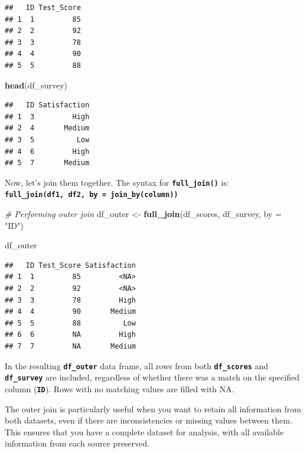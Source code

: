 \documentclass[
]{book}
\newenvironment{Shaded}{\begin{snugshade}}{\end{snugshade}}
\newcommand{\AttributeTok}[1]{\textcolor[rgb]{0.13,0.29,0.53}{#1}}
\newcommand{\CommentTok}[1]{\textcolor[rgb]{0.56,0.35,0.01}{\textit{#1}}}
\newcommand{\FunctionTok}[1]{\textcolor[rgb]{0.13,0.29,0.53}{\textbf{#1}}}
\newcommand{\NormalTok}[1]{#1}
\newcommand{\OtherTok}[1]{\textcolor[rgb]{0.56,0.35,0.01}{#1}}
\newcommand{\StringTok}[1]{\textcolor[rgb]{0.31,0.60,0.02}{#1}}
\begin{document}
\begin{verbatim}
##   ID Test_Score
## 1  1         85
## 2  2         92
## 3  3         78
## 4  4         90
## 5  5         88
\end{verbatim}

\begin{Shaded}
\begin{Highlighting}[]
\FunctionTok{head}\NormalTok{(df\_survey)}
\end{Highlighting}
\end{Shaded}

\begin{verbatim}
##   ID Satisfaction
## 1  3         High
## 2  4       Medium
## 3  5          Low
## 4  6         High
## 5  7       Medium
\end{verbatim}

Now, let's join them together. The syntax for \textbf{\texttt{full\_join()}} is: \textbf{\texttt{full\_join(df1,\ df2,\ by\ =\ join\_by(column))}}

\begin{Shaded}
\begin{Highlighting}[]
\CommentTok{\# Performing outer join}
\NormalTok{df\_outer }\OtherTok{\textless{}{-}} \FunctionTok{full\_join}\NormalTok{(df\_scores, df\_survey, }\AttributeTok{by =} \StringTok{"ID"}\NormalTok{)}


\NormalTok{df\_outer}
\end{Highlighting}
\end{Shaded}

\begin{verbatim}
##   ID Test_Score Satisfaction
## 1  1         85         <NA>
## 2  2         92         <NA>
## 3  3         78         High
## 4  4         90       Medium
## 5  5         88          Low
## 6  6         NA         High
## 7  7         NA       Medium
\end{verbatim}

In the resulting \textbf{\texttt{df\_outer}} data frame, all rows from both \textbf{\texttt{df\_scores}} and \textbf{\texttt{df\_survey}} are included, regardless of whether there was a match on the specified column (\textbf{\texttt{ID}}). Rows with no matching values are filled with NA.

The outer join is particularly useful when you want to retain all information from both datasets, even if there are inconsistencies or missing values between them. This ensures that you have a complete dataset for analysis, with all available information from each source preserved.
\end{document}
